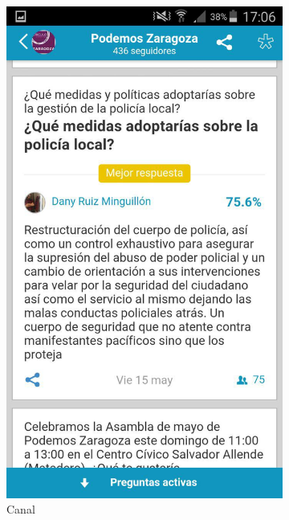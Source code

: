 \begin{figure}[H]
        \centering
        \begin{subfigure}[b]{0.3\textwidth}
                \includegraphics[width=\textwidth]{Media/Captures/appgreeChannel.jpg}
                \caption{Canal}
                \label{fig:appgreeChannel}
        \end{subfigure}
        ~
        \begin{subfigure}[b]{0.3\textwidth}

\end{subfigure}
\end{figure}
